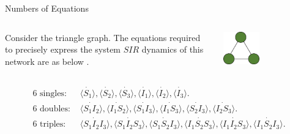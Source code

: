 \documentclass[unknownkeysallowed]{beamer}
\begin{document}
\begin{frame}{Numbers of Equations}

\begin{columns}
\begin{column}{0.5\textwidth}
Consider the triangle graph. The equations required to precisely express the system $SIR$ dynamics of this network are as below \cite{kiss_2014}.
\end{column}

\begin{column}{0.5\textwidth}
\centering\includegraphics[width=0.4\textwidth]{assets/triangle}
\end{column}
\end{columns}

\begin{align}
\text{6 singles: } & \dot{\langle S_1 \rangle}, \dot{\langle S_2 \rangle}, \dot{\langle S_3 \rangle}, \dot{\langle I_1 \rangle}, \dot{\langle I_2 \rangle}, \dot{\langle I_3 \rangle}.\label{eq:SIRsingle}\\
\text{6 doubles: } & \dot{\langle S_1 I_2 \rangle},\dot{\langle I_1 S_2 \rangle}, \dot{\langle S_1 I_3 \rangle}, \dot{\langle I_1 S_3 \rangle}, \dot{\langle S_2 I_3\rangle}, \dot{\langle I_2 S_3 \rangle}.\label{eq:SIRdouble}\\
\text{6 triples: } & \dot{\langle S_1 I_2 I_3 \rangle}, \dot{\langle S_1 I_2 S_3 \rangle}, \dot{\langle S_1 S_2 I_3 \rangle}, \dot{\langle I_1 S_2 S_3 \rangle}, \dot{\langle I_1 I_2 S_3 \rangle}, \dot{\langle I_1 S_2 I_3 \rangle}. \label{eq:SIRtriple}
\end{align}

\end{frame}

\end{document}
